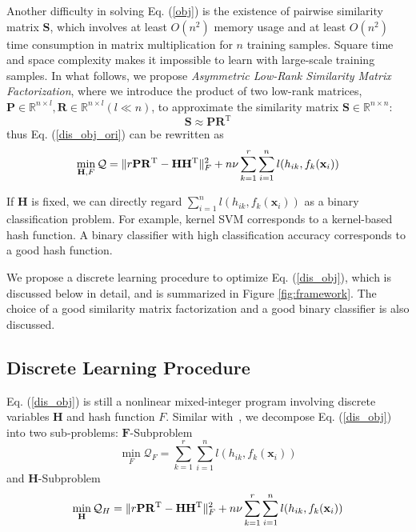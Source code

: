 \documentclass[conference]{IEEEtran}
\begin{document}
Another difficulty in solving Eq. (\ref{obj}) is the existence of pairwise similarity matrix $\mathbf{S}$, which involves at least $O(n^2)$ memory usage and at least $O(n^2)$ time consumption in matrix multiplication for $n$ training samples. Square time and space complexity makes it impossible to learn with large-scale training samples. In what follows, we propose {\em Asymmetric Low-Rank Similarity Matrix Factorization}, where we introduce the product of two low-rank matrices,  $\mathbf{P} \in \mathbb{R}^{n \times l}, \mathbf{R} \in \mathbb{R}^{n \times l}(l \ll n)$, to approximate the similarity matrix $\mathbf{S} \in \mathbb{R}^{n \times n}$:
\begin{equation}
\mathbf{S} \approx \mathbf{P}\mathbf{R}^\mathrm{T}
\label{lowrank_mat}
\end{equation}
thus Eq. (\ref{dis_obj_ori}) can be rewritten as
\begin{equation}
\min_{\mathbf{H}, F} \mathcal{Q} = \Arrowvert r\mathbf{P}\mathbf{R}^\mathrm{T}- \mathbf{H} \mathbf{H}^\mathrm{T} \Arrowvert_F^2 + n \nu \sum_{k=1}^r \sum_{i=1}^n l(h_{ik}, f_k(\mathbf{x}_i))
\label{dis_obj}
\end{equation}

If $\mathbf{H}$ is fixed, we can directly regard $\sum_{i=1}^n l (h_{ik}, f_k(\mathbf{x}_i))$ as a binary classification problem. For example, kernel SVM corresponds to a kernel-based hash function. A binary classifier with high classification accuracy corresponds to a good hash function.

We propose a discrete learning procedure to optimize Eq. (\ref{dis_obj}), which is discussed below in detail, and is summarized in Figure \ref{fig:framework}. The choice of a good similarity matrix factorization and a good binary classifier is also discussed.

\subsection{Discrete Learning Procedure}

Eq. (\ref{dis_obj}) is still a nonlinear mixed-integer program involving discrete variables $\mathbf{H}$ and hash function $F$. Similar with~\cite{liu2014discrete}, we decompose Eq. (\ref{dis_obj}) into two sub-problems: $\mathbf{F}$-Subproblem
\begin{equation}
\min_{F} \mathcal{Q}_F = \sum_{k=1}^r \sum_{i=1}^n l (h_{ik}, f_k(\mathbf{x}_i))
\label{wsub}
\end{equation}
and $\mathbf{H}$-Subproblem
\begin{equation}
\min_{\mathbf{H}} \mathcal{Q}_H = \Arrowvert r\mathbf{P}\mathbf{R}^\mathrm{T} - \mathbf{H} \mathbf{H}^\mathrm{T} \Arrowvert_F^2 + n \nu \sum_{k=1}^r \sum_{i=1}^n l (h_{ik}, f_k(\mathbf{x}_i))
\label{hsub}
\end{equation}
\end{document}
